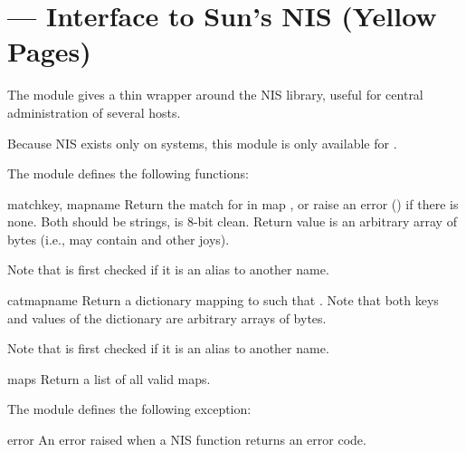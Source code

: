 \section{ ---
         Interface to Sun's NIS (Yellow Pages)}


The  module gives a thin wrapper around the NIS library, useful
for central administration of several hosts.

Because NIS exists only on \UNIX{} systems, this module is
only available for \UNIX{}.

The  module defines the following functions:

\begin{funcdesc}{match}{key, mapname}
Return the match for  in map , or raise an
error () if there is none.
Both should be strings,  is 8-bit clean.
Return value is an arbitrary array of bytes (i.e., may contain 
and other joys).

Note that  is first checked if it is an alias to another name.
\end{funcdesc}

\begin{funcdesc}{cat}{mapname}
Return a dictionary mapping  to  such that
.
Note that both keys and values of the dictionary are arbitrary
arrays of bytes.

Note that  is first checked if it is an alias to another name.
\end{funcdesc}

\begin{funcdesc}{maps}{}
Return a list of all valid maps.
\end{funcdesc}


The  module defines the following exception:

\begin{excdesc}{error}
An error raised when a NIS function returns an error code.
\end{excdesc}
